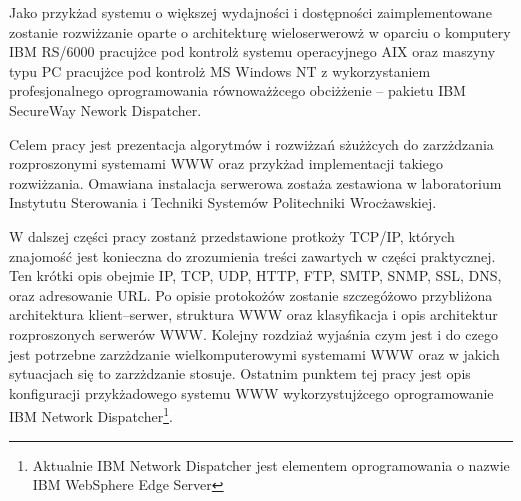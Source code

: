 Jako przykżad systemu o większej wydajności i dostępności zaimplementowane zostanie rozwiżzanie oparte o architekturę
wieloserwerowż w oparciu o komputery IBM RS/6000 pracujżce pod kontrolż systemu operacyjnego AIX oraz maszyny typu PC
pracujżce pod kontrolż MS Windows NT z wykorzystaniem profesjonalnego oprogramowania równoważżcego obciżżenie -- pakietu
IBM SecureWay Nework Dispatcher.

Celem pracy jest prezentacja algorytmów i rozwiżzań sżużżcych do zarzżdzania rozproszonymi
systemami WWW oraz przykżad implementacji takiego rozwiżzania.
Omawiana instalacja serwerowa zostaża zestawiona w laboratorium Instytutu Sterowania i Techniki Systemów
Politechniki Wrocżawskiej.

W dalszej części pracy zostanż przedstawione protkoży TCP/IP, których znajomość jest konieczna do zrozumienia treści zawartych
w części praktycznej. Ten krótki opis obejmie IP, TCP, UDP, HTTP, FTP, SMTP, SNMP, SSL, DNS, oraz adresowanie URL. Po opisie
protokożów zostanie szczegóżowo przybliżona architektura klient--serwer, struktura WWW oraz klasyfikacja i opis architektur
rozproszonych serwerów WWW. Kolejny rozdziaż wyjaśnia czym jest i do czego jest potrzebne zarzżdzanie wielkomputerowymi
systemami WWW oraz w jakich sytuacjach się to zarzżdzanie stosuje. Ostatnim punktem tej pracy jest opis konfiguracji
przykżadowego systemu WWW wykorzystujżcego oprogramowanie IBM Network Dispatcher\footnote{Aktualnie IBM Network Dispatcher jest elementem oprogramowania o nazwie IBM WebSphere Edge Server}.
